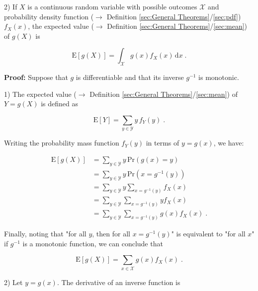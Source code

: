 \documentclass[a4paper,12pt,twoside]{book}
\begin{document}
2) If $X$ is a continuous random variable with possible outcomes $\mathcal{X}$ and probability density function ($\rightarrow$ Definition \ref{sec:General Theorems}/\ref{sec:pdf}) $f_X(x)$, the expected value ($\rightarrow$ Definition \ref{sec:General Theorems}/\ref{sec:mean}) of $g(X)$ is

\begin{equation} \label{eq:mean-lotus-mean-lotus-cont}
\mathrm{E}[g(X)] = \int_{\mathcal{X}} g(x) f_X(x) \, \mathrm{d}x \; .
\end{equation}


\vspace{1em}
\textbf{Proof:} Suppose that $g$ is differentiable and that its inverse $g^{-1}$ is monotonic.

1) The expected value ($\rightarrow$ Definition \ref{sec:General Theorems}/\ref{sec:mean}) of $Y = g(X)$ is defined as

\begin{equation} \label{eq:mean-lotus-mean-lotus-disc-s1}
\mathrm{E}[Y] = \sum_{y \in \mathcal{Y}} y \, f_Y(y) \; .
\end{equation}

Writing the probability mass function $f_Y(y)$ in terms of $y = g(x)$, we have:

\begin{equation} \label{eq:mean-lotus-mean-lotus-disc-s2}
\begin{split}
\mathrm{E}[g(X)] &= \sum_{y \in \mathcal{Y}} y \, \mathrm{Pr}(g(x) = y) \\
&= \sum_{y \in \mathcal{Y}} y \, \mathrm{Pr}(x = g^{-1}(y)) \\
&= \sum_{y \in \mathcal{Y}} y \sum_{x = g^{-1}(y)} f_X(x) \\
&= \sum_{y \in \mathcal{Y}} \sum_{x = g^{-1}(y)} y f_X(x) \\
&= \sum_{y \in \mathcal{Y}} \sum_{x = g^{-1}(y)} g(x) f_X(x) \; .
\end{split}
\end{equation}

Finally, noting that "for all $y$, then for all $x = g^{-1}(y)$" is equivalent to "for all $x$" if $g^{-1}$ is a monotonic function, we can conclude that

\begin{equation} \label{eq:mean-lotus-mean-lotus-disc-s3}
\mathrm{E}[g(X)] = \sum_{x \in \mathcal{X}} g(x) f_X(x) \; .
\end{equation}

\vspace{1em}
2) Let $y = g(x)$. The derivative of an inverse function is
\end{document}

